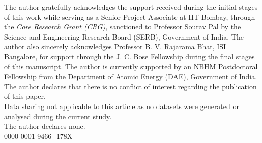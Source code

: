 \documentclass[a4paper,11pt, reqno]{amsart}
\theoremstyle{definition}
\begin{document}
 The author gratefully acknowledges the support received during the initial stages of this work while serving as a Senior Project Associate at IIT Bombay, through the \textit{Core Research Grant (CRG)}, sanctioned to Professor Sourav Pal by the Science and Engineering Research Board (SERB), Government of India. The author also sincerely acknowledges Professor B. V. Rajarama Bhat, ISI Bangalore, for support through the J. C. Bose Fellowship during the final stages of this manuscript. The author is currently supported by an NBHM Postdoctoral Fellowship from the Department of Atomic Energy (DAE), Government of India.\\

 The author declares that there is no conflict of interest regarding the publication of this paper.\\

 Data sharing not applicable to this article as no datasets were generated or analysed during the current study.\\

 The author declares none.\\

 0000-0001-9466-
178X
\end{document}
